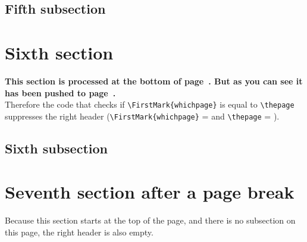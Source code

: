 \documentclass{article}
\newcounter{thispage}
\begin{document}
\lipsum[1-7]

\subsection{Fifth subsection}

\lipsum[8-16]

\section{Sixth section}
\label{sec:push}

{\bfseries This section is processed at the bottom of page~\thethispage. But as you can see it has been pushed to page~\pageref{sec:push}.}\\
Therefore the code that checks if \verb|\FirstMark{whichpage}| is equal to \verb|\thepage| suppresses the right header
(\verb|\FirstMark{whichpage}| = \thethispage{} and  \verb|\thepage| = \pageref{sec:push}).

\medskip

\lipsum[1-6]

\subsection{Sixth subsection}

\lipsum[7]

\newpage
\section{Seventh section after a page break}
\label{sec:newpage}

Because this section starts at the top of the page, and there is no subsection on this page, the right header is also empty.

\medskip

\lipsum[8-10]
\end{document}

